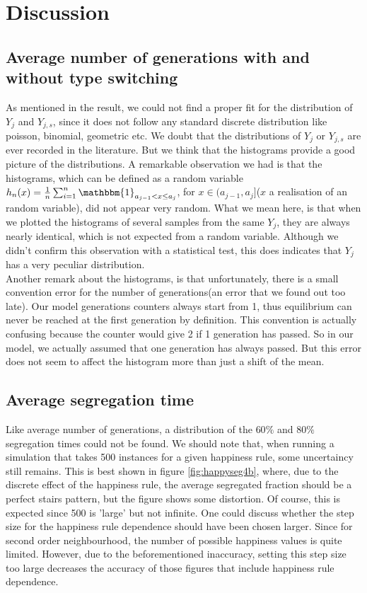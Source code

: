 \section{Discussion}
\subsection{Average number of generations with and without type switching}
As mentioned in the result, we could not find a proper fit for the distribution of $Y_{j}$ and $Y_{j,s}$, since it does not follow any standard discrete distribution like poisson, binomial, geometric etc. We doubt that the distributions of $Y_j$ or $Y_{j,s}$ are ever recorded in the literature. But we think that the histograms provide a good picture of the distributions. A remarkable observation we had is that the histograms, which can be defined as a random variable $h_n(x)=\frac{1}{n}\sum^n_{i=1}\mathbbm{1}_{a_{j-1}<x\leq a_j}$, for $x\in (a_{j-1},a_j]$($x$ a realisation of an random variable),  did not appear very random. What we mean here, is that when we plotted the histograms of several samples from the same $Y_j$, they are always nearly identical, which is not expected from a random variable. Although we didn't confirm this observation with a statistical test, this does indicates that $Y_j$ has a very peculiar distribution.\\

Another remark about the histograms, is that unfortunately, there is a small convention error for the number of generations(an error that we found out too late). Our model generations counters always start from 1, thus equilibrium can never be reached at the first generation by definition. This convention is actually confusing because the counter would give 2 if 1 generation has passed. So in our model, we actually assumed that one generation has always passed. But this error does not seem to affect the histogram more than just a shift of the mean.

\subsection{Average segregation time}
Like average number of generations, a distribution of the $60\%$ and $80\%$ segregation times could not be found. We should note that, when running a simulation that takes 500 instances for a given happiness rule, some uncertaincy still remains. This is best shown in figure \ref{fig:happyseg4b}, where, due to the discrete effect of the happiness rule, the average segregated fraction should be a perfect stairs pattern, but the figure shows some distortion. Of course, this is expected since 500 is 'large' but not infinite. One could discuss whether the step size for the happiness rule dependence should have been chosen larger. Since for second order neighbourhood, the number of possible happiness values is quite limited. However, due to the beforementioned inaccuracy, setting this step size too large decreases the accuracy of those figures that include happiness rule dependence.

